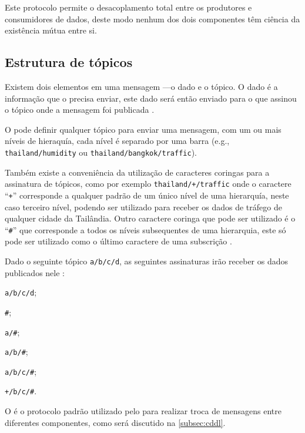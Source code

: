 Este protocolo permite o desacoplamento total entre os produtores e consumidores de dados, deste modo nenhum dos dois componentes têm ciência da existência mútua entre si.

\subsection{Estrutura de tópicos}

Existem dois elementos em uma mensagem \mqtt---o dado e o tópico. O dado é a informação que o \pub precisa enviar, este dado será então enviado para o \sub que assinou o tópico onde a mensagem foi publicada \cite{tantitharanukul:et-al:2017}.

O \pub pode definir qualquer tópico para enviar uma mensagem, com um ou mais níveis de hieraquía, cada nível é separado por uma barra (e.g., \texttt{thailand/humidity} ou \texttt{thailand/bangkok/traffic}).

Também existe a conveniência da utilização de caracteres coringas para a assinatura de tópicos, como por exemplo \texttt{thailand/+/traffic} onde o caractere ``\texttt{+}'' corresponde a qualquer padrão de um único nível de uma hierarquía, neste caso terceiro nível, podendo ser utilizado para receber os dados de tráfego de qualquer cidade da Tailândia. Outro caractere coringa que pode ser utilizado é o ``\texttt{\#}'' que corresponde a todos os níveis subsequentes de uma hierarquia, este só pode ser utilizado como o último caractere de uma subscrição \cite{hunkeler:truong:stanford-clark:2008}.

Dado o seguinte tópico \texttt{a/b/c/d}, as seguintes assinaturas irão receber os dados publicados nele \cite{light:mosquitto}:

\begin{alineas}
	\item \texttt{a/b/c/d};
	\item \texttt{\#};
	\item \texttt{a/\#};
	\item \texttt{a/b/\#};
	\item \texttt{a/b/c/\#};
	\item \texttt{+/b/c/\#}.
\end{alineas}

O \mqtt é o protocolo padrão utilizado pelo \cddl para realizar troca de mensagens entre diferentes componentes, como será discutido na \autoref{subsec:cddl}.
		
\section{\mhubcddl}

